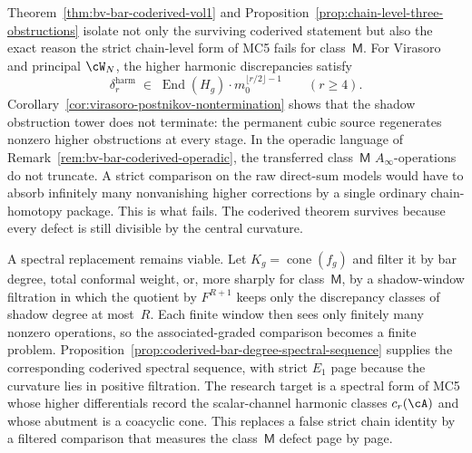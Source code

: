 \begin{remark}
\label{rem:bv-bar-class-m-frontier}
%
%
Theorem~\ref{thm:bv-bar-coderived-vol1} and
Proposition~\ref{prop:chain-level-three-obstructions} isolate not
only the surviving coderived statement but also the exact reason the
strict chain-level form of MC5 fails for class~$\mathsf{M}$. For
Virasoro and principal $\cW_N$, the higher harmonic discrepancies
satisfy
\[
\delta_r^{\mathrm{harm}}
\;\in\;
\operatorname{End}(H_g)\cdot m_0^{\lfloor r/2 \rfloor - 1}
\qquad (r \geq 4).
\]
Corollary~\ref{cor:virasoro-postnikov-nontermination} shows that the
shadow obstruction tower does not terminate: the permanent cubic
source regenerates nonzero higher obstructions at every stage. In the
operadic language of
Remark~\ref{rem:bv-bar-coderived-operadic}, the transferred
class~$\mathsf{M}$ $A_\infty$-operations do not truncate. A strict
comparison on the raw direct-sum models would have to absorb
infinitely many nonvanishing higher corrections by a single ordinary
chain-homotopy package. This is what fails. The coderived theorem
survives because every defect is still divisible by the central
curvature.

A spectral replacement remains viable. Let
$K_g = \operatorname{cone}(f_g)$ and filter it by bar degree, total
conformal weight, or, more sharply for class~$\mathsf{M}$, by a
shadow-window filtration in which the quotient by $F^{R+1}$ keeps only
the discrepancy classes of shadow degree at most~$R$. Each finite
window then sees only finitely many nonzero operations, so the
associated-graded comparison becomes a finite problem.
Proposition~\ref{prop:coderived-bar-degree-spectral-sequence}
supplies the corresponding coderived spectral sequence, with strict
$E_1$ page because the curvature lies in positive filtration. The
research target is a spectral form of MC5 whose higher differentials
record the scalar-channel harmonic classes $c_r(\cA)$ and whose abutment is a
coacyclic cone. This replaces a false strict chain identity by a
filtered comparison that measures the class~$\mathsf{M}$ defect page
by page.


\end{remark}

